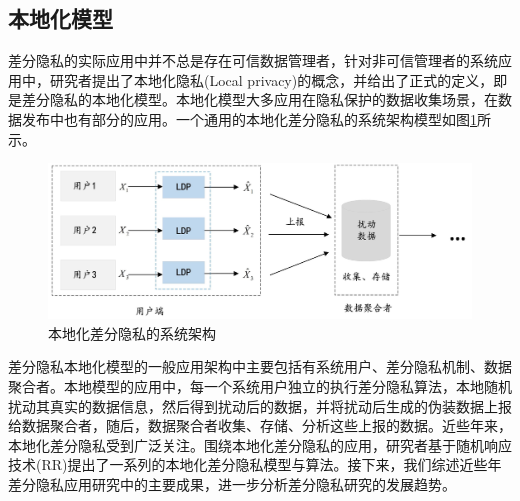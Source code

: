 \subsection{本地化模型}
差分隐私的实际应用中并不总是存在可信数据管理者，针对非可信管理者的系统应用中，研究者提出了本地化隐私\cite{kasiviswanathan2011what}(Local privacy)的概念，并给出了正式的定义，即是差分隐私的本地化模型\cite{duchi2013local,duchi2013Minimax}。本地化模型大多应用在隐私保护的数据收集场景\cite{wang2019collecting,fanti2016building,erlingsson2014rappor,wang2016using}，在数据发布中也有部分的应用\cite{yang2017copula,ren2018textsf}。一个通用的本地化差分隐私的系统架构模型如图\ref{fig:chapter02-LDP-model}所示。
\begin{figure}[htbp]
	\centering
	\includegraphics[width = 0.85\linewidth]{./figures/chapter02_2.jpg}
	\caption{本地化差分隐私的系统架构}
	\label{fig:chapter02-LDP-model}
\end{figure}

差分隐私本地化模型的一般应用架构中主要包括有系统用户、差分隐私机制、数据聚合者。本地模型的应用中，每一个系统用户独立的执行差分隐私算法，本地随机扰动其真实的数据信息，然后得到扰动后的数据，并将扰动后生成的伪装数据上报给数据聚合者，随后，数据聚合者收集、存储、分析这些上报的数据。近些年来，本地化差分隐私受到广泛关注。围绕本地化差分隐私的应用，研究者基于随机响应技术(RR)\cite{warner1965randomized}提出了一系列的本地化差分隐私模型与算法。接下来，我们综述近些年差分隐私应用研究中的主要成果，进一步分析差分隐私研究的发展趋势。





